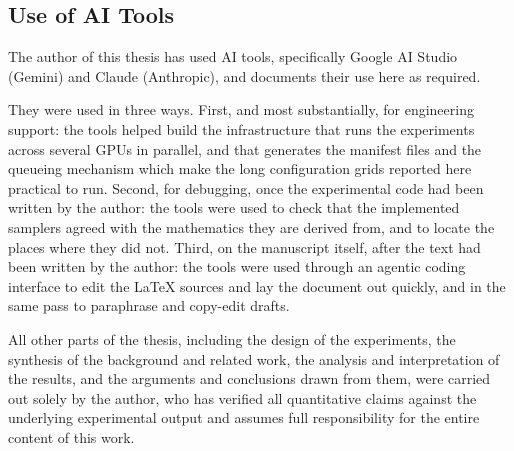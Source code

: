 

\subsection{Use of AI Tools}
\label{app:ai-tools}

The author of this thesis has used AI tools, specifically Google AI Studio (Gemini) and Claude (Anthropic), and documents their use here as required.

They were used in three ways. First, and most substantially, for engineering support: the tools helped build the infrastructure that runs the experiments across several GPUs in parallel, and that generates the manifest files and the queueing mechanism which make the long configuration grids reported here practical to run. Second, for debugging, once the experimental code had been written by the author: the tools were used to check that the implemented samplers agreed with the mathematics they are derived from, and to locate the places where they did not. Third, on the manuscript itself, after the text had been written by the author: the tools were used through an agentic coding interface to edit the LaTeX sources and lay the document out quickly, and in the same pass to paraphrase and copy-edit drafts.

All other parts of the thesis, including the design of the experiments, the synthesis of the background and related work, the analysis and interpretation of the results, and the arguments and conclusions drawn from them, were carried out solely by the author, who has verified all quantitative claims against the underlying experimental output and assumes full responsibility for the entire content of this work.
